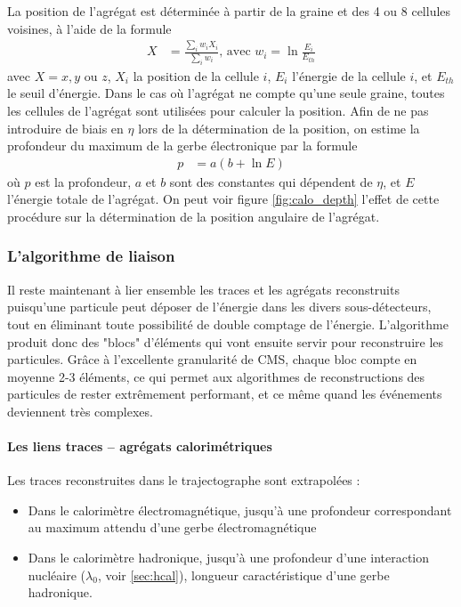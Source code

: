 \medskip

La position de l'agrégat est déterminée à partir de la graine et des 4 ou 8 cellules voisines, à l'aide de la formule
\begin{align*}
  X &= \frac{ \sum_i{w_i X_i} }{ \sum_i{w_i} }\text{, avec } w_i = \ln{\frac{E_i}{E_{th}}}
\end{align*}
avec $X = x, y$ ou $z$, $X_i$ la position de la cellule $i$, $E_i$ l'énergie de la cellule $i$, et $E_{th}$ le seuil d'énergie. Dans le cas où l'agrégat ne compte qu'une seule graine, toutes les cellules de l'agrégat sont utilisées pour calculer la position. Afin de ne pas introduire de biais en $\eta$ lors de la détermination de la position, on estime la profondeur du maximum de la gerbe électronique par la formule
\begin{align*}
  p &= a\left( b + \ln{E} \right)
\end{align*}
où $p$ est la profondeur, $a$ et $b$ sont des constantes qui dépendent de $\eta$, et $E$ l'énergie totale de l'agrégat. On peut voir figure \ref{fig:calo_depth} l'effet de cette procédure sur la détermination de la position angulaire de l'agrégat.

\subsubsection{L'algorithme de liaison} \label{sec:pf_links}

Il reste maintenant à lier ensemble les traces et les agrégats reconstruits puisqu'une particule peut déposer de l'énergie dans les divers sous-détecteurs, tout en éliminant toute possibilité de double comptage de l'énergie. L'algorithme produit donc des "blocs" d'éléments qui vont ensuite servir pour reconstruire les particules. Grâce à l'excellente granularité de CMS, chaque bloc compte en moyenne 2-3 éléments, ce qui permet aux algorithmes de reconstructions des particules de rester extrêmement performant, et ce même quand les événements deviennent très complexes.

\paragraph{Les liens traces – agrégats calorimétriques}

Les traces reconstruites dans le trajectographe sont extrapolées :
\begin{itemize}
  \item Dans le calorimètre électromagnétique, jusqu'à une profondeur correspondant au maximum attendu d'une gerbe électromagnétique
  \item Dans le calorimètre hadronique, jusqu'à une profondeur d'une interaction nucléaire ($\lambda_0$, voir \cref{sec:hcal}), longueur caractéristique d'une gerbe hadronique.
\end{itemize}

